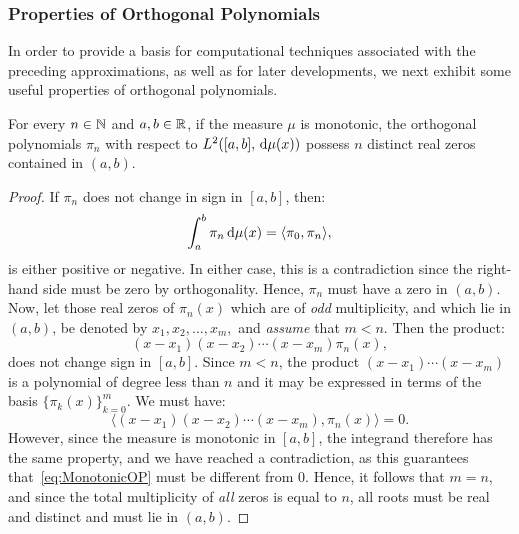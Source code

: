 \subsubsection{Properties of Orthogonal Polynomials}

In order to provide a basis for computational techniques associated with the preceding approximations, as well as for later developments, we next exhibit some useful properties of orthogonal polynomials.

\begin{theorem}\label{theorem:OPzeros}
For every $n\in\mathbb{N}$ and $a,b\in\mathbb{R}$, if the measure $\mu$ is monotonic, the orthogonal polynomials $\pi_n$ with respect to $L^2([a,b],{\rm\,d}\mu(x))$ possess $n$ distinct real zeros contained in $(a,b)$.
\end{theorem}
\begin{proof}
If $\pi_n$ does not change in sign in $[a,b]$, then:
\[
\int_a^b\pi_n{\rm\,d}\mu(x) = \langle \pi_0,\pi_n\rangle,
\]
is either positive or negative. In either case, this is a contradiction since the right-hand side must be zero by orthogonality. Hence, $\pi_n$ must have a zero in $(a,b)$. Now, let those real zeros of $\pi_n(x)$ which are of {\em odd} multiplicity, and which lie in $(a,b)$, be denoted by $x_1, x_2,\ldots, x_m,$ and {\em assume} that $m<n$. Then the product:
\[
(x-x_1)(x-x_2)\cdots(x-x_m)\pi_n(x),
\]
does not change sign in $[a,b]$. Since $m<n$, the product $(x-x_1)\cdots(x-x_m)$ is a polynomial of degree less than $n$ and it may be expressed in terms of the basis $\{\pi_k(x)\}_{k=0}^m$. We must have:
\begin{equation}\label{eq:MonotonicOP}
\langle (x-x_1)(x-x_2)\cdots(x-x_m),\pi_n(x)\rangle = 0.
\end{equation}
However, since the measure is monotonic in $[a,b]$, the integrand therefore has the same property, and we have reached a contradiction, as this guarantees that~\eqref{eq:MonotonicOP} must be different from $0$. Hence, it follows that $m=n$, and since the total multiplicity of {\em all} zeros is equal to $n$, all roots must be real and distinct and must lie in $(a,b)$.
\end{proof}

